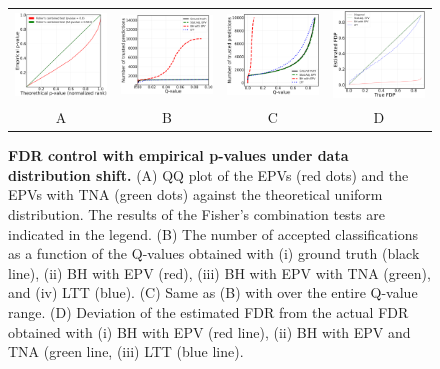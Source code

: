 \documentclass{article}
\begin{document}
\begin{figure}[hp]
	\centering
	\begin{tabular}{cccc}
		\includegraphics[width=1.7in]{img/cnn_QQ_intensity_down.png}&
		\includegraphics[width=1.7in]{img/cnn_intensity_down_fdr_control_loc.png} &
		\includegraphics[width=1.7in]
        {img/cnn_intensity_down_fdr_control.png} & 
            \includegraphics[width=1.7in]{img/cnn_FDPscat_intensity_down.png} \\		
		A & B & C & D \\
	\end{tabular}
	\caption{{\bf  FDR control with empirical p-values under data distribution shift.}
		(A) QQ plot of the EPVs (red dots) and the EPVs with TNA (green dots) against the theoretical uniform distribution. The results of the Fisher's combination tests are indicated in the legend. (B) The number of accepted classifications as a function of the Q-values obtained with (i) ground truth (black line), (ii) BH with EPV (red), (iii) BH with EPV with TNA (green), and (iv) LTT (blue). (C) Same as (B) with over the entire Q-value range. (D) Deviation of the estimated FDR from the actual FDR obtained with (i) BH with EPV (red line), (ii) BH with EPV and TNA (green line, (iii) LTT (blue line).}
	\label{fig:mnist_shfit}
\end{figure}
\end{document}
